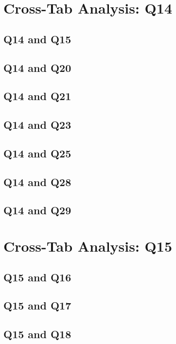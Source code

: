 \documentclass{report}
\begin{document}
\chapter{Cross-Tab Analysis: Q14}

\section{Q14 and Q15}\clearpage
\section{Q14 and Q20}\clearpage
\section{Q14 and Q21}\clearpage
\section{Q14 and Q23}\clearpage
\section{Q14 and Q25}\clearpage
\section{Q14 and Q28}\clearpage
\section{Q14 and Q29}\clearpage

\chapter{Cross-Tab Analysis: Q15}

\section{Q15 and Q16}\clearpage
\section{Q15 and Q17}\clearpage
\section{Q15 and Q18}\clearpage
\end{document}
